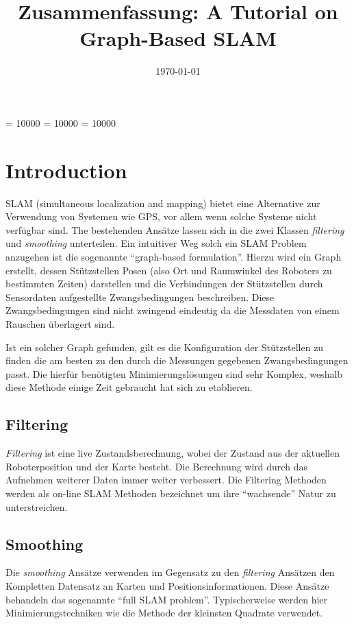 \documentclass[12pt]{article}
\newcommand{\changefont}[3]{
\fontfamily{#1} \fontseries{#2} \fontshape{#3} \selectfont}
\begin{document}
\clubpenalty = 10000
\widowpenalty = 10000 
\displaywidowpenalty = 10000

\onehalfspacing
\changefont{ptm}{m}{n} 

\begin{titlepage}
\author{}
\title{Zusammenfassung: A Tutorial on Graph-Based SLAM}
\date{\today} 
\maketitle
\thispagestyle{empty}
\end{titlepage}


\tableofcontents
\thispagestyle{empty}
\newpage
{}

\section{Introduction}
SLAM (simultaneous localization and mapping) bietet eine Alternative zur Verwendung von Systemen wie GPS, vor allem wenn solche Systeme nicht
verfügbar sind. The bestehenden Ansätze lassen sich in die zwei Klassen \textit{filtering} und \textit{smoothing} unterteilen.
Ein intuitiver Weg solch ein SLAM Problem anzugehen ist die sogenannte ``graph-based formulation''. Hierzu wird ein Graph erstellt, dessen
Stützstellen Posen (also Ort und Raumwinkel des Roboters zu bestimmten Zeiten) darstellen und die Verbindungen der Stützstellen durch Sensordaten
aufgestellte Zwangsbedingungen beschreiben. Diese Zwangsbedingungen sind nicht zwingend eindeutig da die Messdaten von einem Rauschen überlagert
sind.

Ist ein solcher Graph gefunden, gilt es die Konfiguration der Stützstellen zu finden die am besten zu den durch die Messungen gegebenen
Zwangsbedingungen passt. Die hierfür benötigten Minimierungslösungen sind sehr Komplex, weshalb diese Methode einige Zeit gebraucht hat sich zu 
etablieren.

\subsection{Filtering}
\textit{Filtering} ist eine live Zustandsberechnung, wobei der Zustand aus der aktuellen Roboterposition und der Karte besteht. Die Berechnung
wird durch das Aufnehmen weiterer Daten immer weiter verbessert. Die Filtering Methoden werden als on-line SLAM Methoden bezeichnet um ihre
``wachsende'' Natur zu unterstreichen.

\subsection{Smoothing}
Die \textit{smoothing} Ansätze verwenden im Gegensatz zu den \textit{filtering} Ansätzen den Kompletten Datensatz an Karten und 
Positionsinformationen. Diese Ansätze behandeln das sogenannte ``full SLAM problem''. Typischerweise werden hier Minimierungstechniken wie die
Methode der kleinsten Quadrate verwendet.
\end{document}
